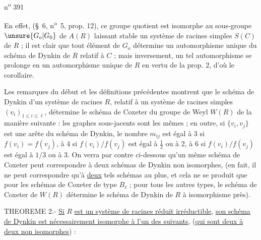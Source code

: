 \hfill n\textsuperscript{o} 391

En effet, (\S~6, n\textsuperscript{o}~5, prop. 12), ce groupe quotient est isomorphe au sous-groupe $\unsure{G_o|G_0}$ de $A(R)$ laissant stable un système de racines simples $S(C)$ de $R$ ; il est clair que tout élément de $G_o$ détermine un automorphisme unique du schéma de Dynkin de $R$ relatif à $C$ ; mais inversement, un tel automorphisme se prolonge en un automorphisme unique de $R$ en vertu de la prop. 2, d'où le corollaire.

Les remarques du début et les définitions précédentes montrent que le schéma de Dynkin d'un système de racines $R$, relatif à un système de racines simples $(v_i)_{1\leq i\leq\ell}$, détermine le schéma de Coxeter du groupe de Weyl $W(R)$ de la manière suivante : les graphes sous-jacents sont les mêmes ; en outre, si $\{v_i,v_j\}$ est une arête du schéma de Dynkin, le nombre $m_{ij}$ est égal à 3 si $f(v_i)=f(v_j)$, à 4 si $f(v_i)/f(v_j)$ est égal à $\frac{1}{2}$ ou à 2, à 6 si $f(v_i)/f(v_j)$ est égal à $1/3$ ou à 3. On verra par contre ci-dessous qu'un même schéma de Coxeter peut correspondre à deux schémas de Dynkin non isomorphes, (en fait, il ne peut correspondre qu'à \uline{deux} tels schémas au plus, et cela ne se produit que pour les schémas de Coxeter de type $B_\ell$ ; pour tous les autres types, le schéma de Coxeter de $W(R)$ détermine le schéma de Dynkin de $R$ à isomorphisme près).

THEOREME 2.- \uline{Si} $R$ \uline{est un système de racines réduit irréductible}, \uline{son schéma de Dynkin est nécessairement isomorphe à l'un des suivants}, (\uline{qui sont deux à deux non isomorphes}) :



